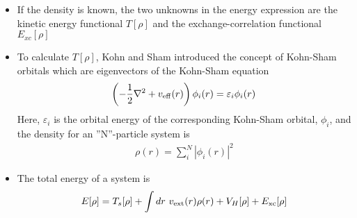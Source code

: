 \documentclass[slidestop,mathserif,compress,xcolor=svgnames]{beamer}
\begin{document}
\begin{frame}
\footnotesize{
\begin{columns}
\column{12cm}
\begin{itemize}
\item If the density is known, the two unknowns in the energy expression are the kinetic energy functional $T[\rho]$ and the exchange-correlation functional $E_{xc}[\rho]$
\item To calculate $T[\rho]$, Kohn and Sham introduced the concept of Kohn-Sham orbitals which are eigenvectors of the Kohn-Sham equation 
\begin{align*}
\left(-\dfrac{1}{2}\nabla^2+v_{\rm eff}(r)\right)\phi_{i}(r)=\varepsilon_{i}\phi_{i}(r)
\end{align*}
Here, $\varepsilon_i$ is the orbital energy of the corresponding Kohn-Sham orbital, $\phi_i$, and the density for an ''N''-particle system is
\begin{align*}
\rho(r)=\sum_i^N |\phi_{i}(r)|^2
\end{align*}
\item The total energy of a system is 
\begin{align*}
E[\rho]  = T_s[\rho] + \int dr\ v_{\rm ext}(r)\rho(r) + V_{H}[\rho] + E_{\rm xc}[\rho]
\end{align*}
\end{itemize}
\end{columns}
}
\end{frame}
\end{document}
